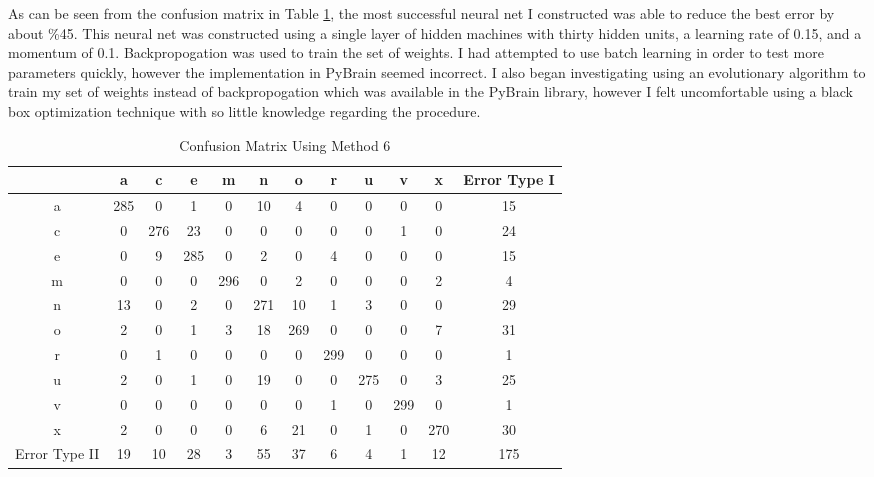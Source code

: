 \documentclass[12pt]{article}
\begin{document}
As can be seen from the confusion matrix in Table \ref{tab:nn}, the most
successful neural net I constructed was able to reduce the best error by about
\%45. This neural net was constructed using a single layer of hidden machines
with thirty hidden units, a learning rate of 0.15, and a momentum of 0.1.
Backpropogation was used to train the set of weights. I had attempted to use
batch learning in order to test more parameters quickly, however the
implementation in PyBrain seemed incorrect. I also began investigating using an
evolutionary algorithm to train my set of weights instead of backpropogation
which was available in the PyBrain library, however I felt uncomfortable using
a black box optimization technique with so little knowledge regarding the
procedure.


\begin{table}[!ht]
    \centering
    \caption{Confusion Matrix Using Method 6}
    \begin{tabular}{| c | c | c | c | c | c | c | c | c | c | c | c |} \hline
        & a & c & e & m & n & o & r & u & v & x & Error Type I\\ \hline
      a & 285 & 0 & 1 & 0 & 10 & 4 & 0 & 0 & 0 & 0 & 15\\ \hline
      c & 0 & 276 & 23 & 0 & 0 & 0 & 0 & 0 & 1 & 0 & 24\\ \hline
      e & 0 & 9 & 285 & 0 & 2 & 0 & 4 & 0 & 0 & 0 & 15\\ \hline
      m & 0 & 0 & 0 & 296 & 0 & 2 & 0 & 0 & 0 & 2 & 4\\ \hline
      n & 13 & 0 & 2 & 0 & 271 & 10 & 1 & 3 & 0 & 0 & 29\\ \hline
      o & 2 & 0 & 1 & 3 & 18 & 269 & 0 & 0 & 0 & 7 & 31\\ \hline
      r & 0 & 1 & 0 & 0 & 0 & 0 & 299 & 0 & 0 & 0 & 1\\ \hline
      u & 2 & 0 & 1 & 0 & 19 & 0 & 0 & 275 & 0 & 3 & 25\\ \hline
      v & 0 & 0 & 0 & 0 & 0 & 0 & 1 & 0 & 299 & 0 & 1\\ \hline
      x & 2 & 0 & 0 & 0 & 6 & 21 & 0 & 1 & 0 & 270 & 30\\ \hline
Error Type II & 19 & 10 & 28 & 3 & 55 & 37 & 6 & 4 & 1 & 12 & 175\\ \hline
    \end{tabular}
    \label{tab:nn}
\end{table}

\newpage



\end{document}
